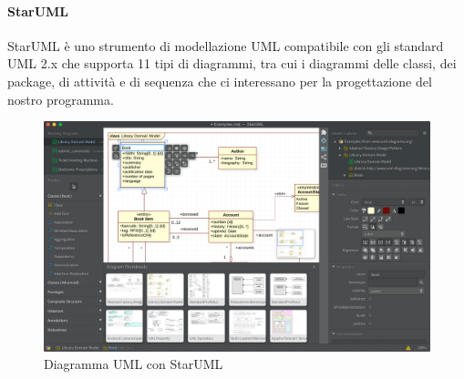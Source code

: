 		\paragraph{StarUML}
		\label{sec:StarUML}
		\Spazio
		StarUML è uno strumento di modellazione UML compatibile con gli standard UML 2.x che supporta 11 tipi di diagrammi, tra cui i diagrammi delle classi, dei package, di attività e di sequenza che ci interessano per la progettazione del nostro programma.
		
		\begin{figure}[h]
		\label{figuraStarUML}
		\centering 
		\includegraphics[width=1\textwidth]{images/starUML.png}
		\caption{Diagramma UML con StarUML} %
		\end{figure}

		
